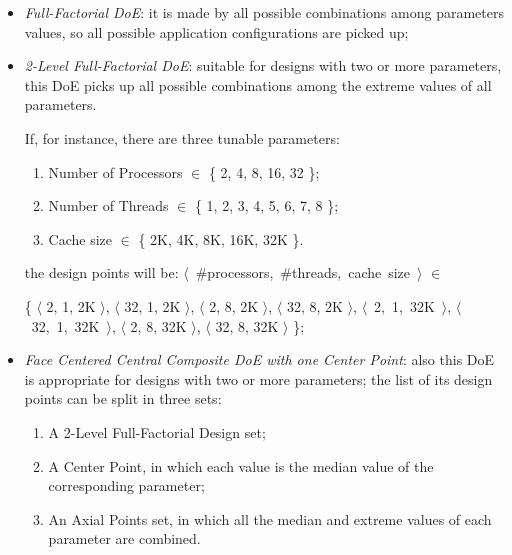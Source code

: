 \begin{itemize}

    \item \textit{Full-Factorial DoE}: it is made by all possible combinations among parameters values, so all possible application configurations are picked up;
 
    \item \textit{2-Level Full-Factorial DoE}: suitable for designs with two or more parameters, this DoE picks up all possible combinations among the extreme values of all parameters.
    
    If, for instance, there are three tunable parameters:
    
    \begin{enumerate}
    
        \item Number of Processors $\in$ \{ 2, 4, 8, 16, 32 \};
        
        \item Number of Threads $\in$ \{ 1, 2, 3, 4, 5, 6, 7, 8 \};
        
        \item Cache size $\in$ \{ 2K, 4K, 8K, 16K, 32K \}.
    
    \end{enumerate}
    
    the design points will be: \hbox{$\langle$ \#processors, \#threads, cache size $\rangle$} $\in$
    
    \{ $\langle$ 2, 1, 2K $\rangle$, $\langle$ 32, 1, 2K $\rangle$, $\langle$ 2, 8, 2K $\rangle$, $\langle$ 32, 8, 2K $\rangle$, \hbox{$\langle$ 2, 1, 32K $\rangle$}, \hbox{$\langle$ 32, 1, 32K $\rangle$}, $\langle$ 2, 8, 32K $\rangle$, $\langle$ 32, 8, 32K $\rangle$ \};

    \item \textit{Face Centered Central Composite DoE with one Center Point}: also this DoE is appropriate for designs with two or more parameters; the list of its design points can be split in three sets:
    
     \begin{enumerate}
    
        \item A 2-Level Full-Factorial Design set;
        
        \item A Center Point, in which each value is the median value of the corresponding parameter;
        
        \item An Axial Points set, in which all the median and extreme values of each parameter are combined.
    

\end{enumerate}
\end{itemize}
